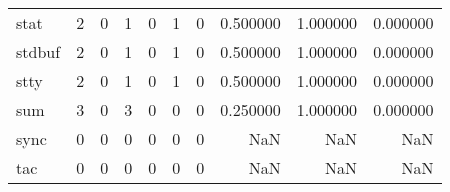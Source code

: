 \begin{longtable}{lrrrrrrrrr}
stat      &                                                  2 &                                                  0 &                                                  1 &                                                  0 &                                                  1 &                                                  0 &                                           0.500000 &                               1.000000 &                             0.000000 \\
stdbuf    &                                                  2 &                                                  0 &                                                  1 &                                                  0 &                                                  1 &                                                  0 &                                           0.500000 &                               1.000000 &                             0.000000 \\
stty      &                                                  2 &                                                  0 &                                                  1 &                                                  0 &                                                  1 &                                                  0 &                                           0.500000 &                               1.000000 &                             0.000000 \\
sum       &                                                  3 &                                                  0 &                                                  3 &                                                  0 &                                                  0 &                                                  0 &                                           0.250000 &                               1.000000 &                             0.000000 \\
sync      &                                                  0 &                                                  0 &                                                  0 &                                                  0 &                                                  0 &                                                  0 &                                                NaN &                                    NaN &                                  NaN \\
tac       &                                                  0 &                                                  0 &                                                  0 &                                                  0 &                                                  0 &                                                  0 &                                                NaN &                                    NaN &                                  NaN \\

\end{longtable}
